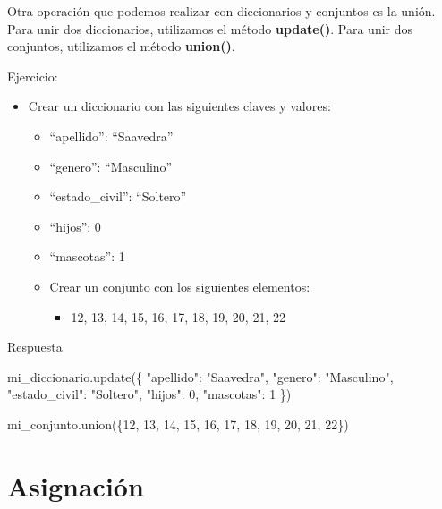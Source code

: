 \documentclass[
  a4paper,
  DIV=11,
  numbers=noendperiod,
  onepage,
  openany]{scrreprt}
\newenvironment{Shaded}{\begin{snugshade}}{\end{snugshade}}
\newcommand{\DecValTok}[1]{\textcolor[rgb]{0.68,0.00,0.00}{#1}}
\newcommand{\NormalTok}[1]{\textcolor[rgb]{0.00,0.23,0.31}{#1}}
\newcommand{\StringTok}[1]{\textcolor[rgb]{0.13,0.47,0.30}{#1}}
\providecommand{\tightlist}{%
  \setlength{\itemsep}{0pt}\setlength{\parskip}{0pt}}\usepackage{longtable,booktabs,array}
\begin{document}
Otra operación que podemos realizar con diccionarios y conjuntos es la
unión. Para unir dos diccionarios, utilizamos el método
\textbf{update()}. Para unir dos conjuntos, utilizamos el método
\textbf{union()}.

Ejercicio:

\begin{itemize}
\tightlist
\item
  Crear un diccionario con las siguientes claves y valores:

  \begin{itemize}
  \tightlist
  \item
    ``apellido'': ``Saavedra''
  \item
    ``genero'': ``Masculino''
  \item
    ``estado\_civil'': ``Soltero''
  \item
    ``hijos'': 0
  \item
    ``mascotas'': 1
  \item
    Crear un conjunto con los siguientes elementos:

    \begin{itemize}
    \tightlist
    \item
      12, 13, 14, 15, 16, 17, 18, 19, 20, 21, 22
    \end{itemize}
  \end{itemize}
\end{itemize}

Respuesta

\begin{Shaded}
\begin{Highlighting}[]
\NormalTok{mi\_diccionario.update(\{}
    \StringTok{"apellido"}\NormalTok{: }\StringTok{"Saavedra"}\NormalTok{,}
    \StringTok{"genero"}\NormalTok{: }\StringTok{"Masculino"}\NormalTok{,}
    \StringTok{"estado\_civil"}\NormalTok{: }\StringTok{"Soltero"}\NormalTok{,}
    \StringTok{"hijos"}\NormalTok{: }\DecValTok{0}\NormalTok{,}
    \StringTok{"mascotas"}\NormalTok{: }\DecValTok{1}
\NormalTok{\})}

\NormalTok{mi\_conjunto.union(\{}\DecValTok{12}\NormalTok{, }\DecValTok{13}\NormalTok{, }\DecValTok{14}\NormalTok{, }\DecValTok{15}\NormalTok{, }\DecValTok{16}\NormalTok{, }\DecValTok{17}\NormalTok{, }\DecValTok{18}\NormalTok{, }\DecValTok{19}\NormalTok{, }\DecValTok{20}\NormalTok{, }\DecValTok{21}\NormalTok{, }\DecValTok{22}\NormalTok{\})}
\end{Highlighting}
\end{Shaded}

\chapter{Asignación}\label{asignaciuxf3n-3}
\end{document}
